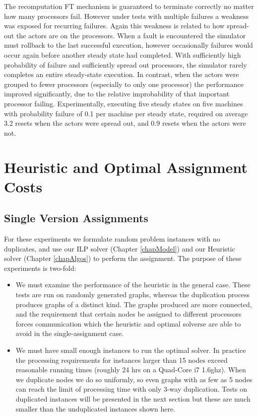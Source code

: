 The recomputation FT mechanism is guaranteed to terminate correctly no matter how many processors fail.
However under tests with multiple failures a weakness was exposed for recurring failures.
Again this weakness is related to how spread-out the actors are on the processors.
When a fault is encountered the simulator must rollback to the last successful execution, however occasionally failures would occur again before another steady state had completed.
With sufficiently high probability of failure and sufficiently spread out processors, the simulator rarely completes an entire steady-state execution.
In contrast, when the actors were grouped to fewer processors (especially to only one processor) the performance improved significantly, due to the relative improbability of that important processor failing.
Experimentally, executing five steady states on five machines with probability failure of 0.1 per machine per steady state, required on average 3.2 resets when the actors were spread out, and 0.9 resets when the actors were not.

\section{Heuristic and Optimal Assignment Costs}

\subsection{Single Version Assignments}

For these experiments we formulate random problem instances with no duplicates, and use our ILP solver (Chapter \ref{chapModel}) and our Heuristic solver (Chapter \ref{chapAlgos}) to perform the assignment.
The purpose of these experiments is two-fold:
\begin{itemize}
	\item We must examine the performance of the heuristic in the general case.
			These tests are run on randomly generated graphs, whereas the duplication process produces graphs of a distinct kind.
			The graphs produced are more connected, and the requirement that certain nodes be assigned to different processors forces communication which the heuristic and optimal solverse are able to avoid in the single-assignment case.
	\item We must have small enough instances to run the optimal solver.
			In practice the processing requirements for instances larger than 15 nodes exceed reasonable running times (roughly 24 hrs on a Quad-Core i7 1.6ghz).
			When we duplicate nodes we do so uniformly, so even graphs with as few as 5 nodes can reach the limit of processing time with only 3-way duplication.
			Tests on duplicated instances will be presented in the next section but these are much smaller than the unduplicated instances shown here.
\end{itemize}


